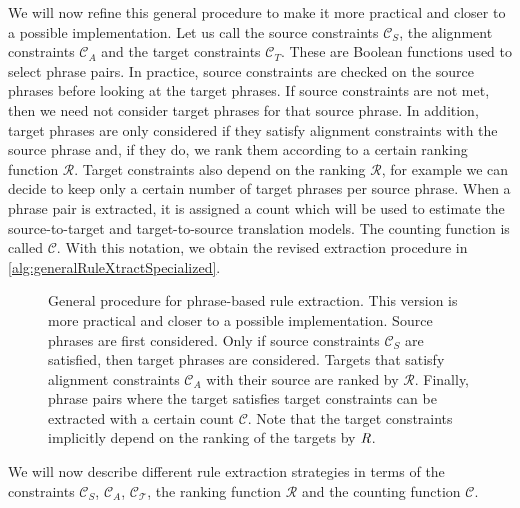 We will now refine this general procedure to make it more practical and
closer to a possible implementation.
Let us call the source constraints $\mathcal{C}_S$, the alignment constraints
$\mathcal{C}_A$ and the target constraints $\mathcal{C}_T$. These are
Boolean functions used to select phrase pairs. In practice, source
constraints are checked on the source phrases before looking
at the target phrases. If source constraints are not met, then we need not
consider target phrases for that source phrase.
In addition, target phrases are only considered if they
satisfy alignment constraints with the source phrase and, if they do, we rank
them according to a certain ranking function $\mathcal{R}$. Target constraints also
depend on the ranking $\mathcal{R}$, for example we can decide to keep only a certain
number of target phrases per source phrase. When a phrase pair is extracted, it
is assigned a count which will be used to estimate the source-to-target and
target-to-source translation models. The counting function is called $\mathcal{C}$.
With this notation, we obtain the revised extraction procedure in
\autoref{alg:generalRuleXtractSpecialized}.
%
\begin{figure}
  \begin{algorithmic}[1]
         
        \EndIf
         
           
          \EndIf
        \EndFor
         
           
          \EndIf
        \EndFor
      \EndFor
    \EndFunction
  \end{algorithmic}
  \caption{General procedure for phrase-based rule extraction. This version
  is more practical and closer to a possible implementation.
  Source phrases are first considered. Only if source constraints $\mathcal{C}_S$ are satisfied, then
  target phrases are considered. Targets that satisfy alignment constraints $\mathcal{C}_A$ with
  their
  source are ranked by $\mathcal{R}$. Finally, phrase pairs where the target
  satisfies target constraints can be extracted with a certain count $\mathcal{C}$.
  Note that the target constraints implicitly depend on the ranking of the
  targets by $\emph{R}$.}
  \label{alg:generalRuleXtractSpecialized}
\end{figure}
%
We will now describe different rule extraction strategies in terms of
the constraints $\mathcal{C}_S$, $\mathcal{C}_A$, $\mathcal{C_T}$,
the ranking function $\mathcal{R}$ and the counting function $\mathcal{C}$.

